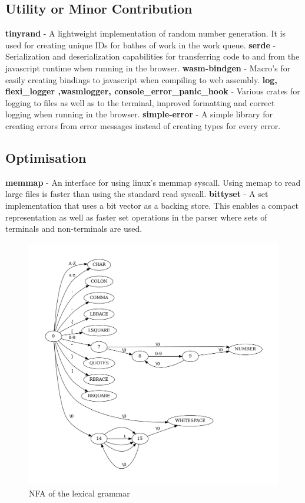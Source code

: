 \subsection{Utility or Minor Contribution}
\textbf{tinyrand} - A lightweight implementation of random number
generation. It is used for creating unique IDs for bathes of work in the work
queue.
\textbf{serde} - Serialization and deserialization capabilities for transferring
code to and from the javascript runtime when running in the browser.
\newline\newline
\textbf{wasm-bindgen} - Macro's for easily creating bindings to javascript when
compiling to web assembly.
\newline\newline
\textbf{log, flexi\_logger ,wasm\-logger, console\_error\_panic\_hook} - Various
crates for logging to files as well as to the terminal, improved formatting and
correct logging when running in the browser.
\newline\newline
\textbf{simple-error} - A simple library for creating errors from error messages
instead of creating types for every error.

\subsection{Optimisation}
\textbf{memmap} - An interface for using linux's memmap syscall. Using memap to
read large files is  faster than using the standard read syscall.
\newline\newline
\textbf{bittyset} - A set implementation that uses a bit vector as a backing
store. This enables a compact representation as well as faster set operations in
the parser where sets of terminals and non-terminals are used.

\begin{figure}[t]
\includegraphics[width=\linewidth]{images/nfa.png}
\caption{NFA of the lexical grammar}
\label{fig:nfa}
\end{figure}

